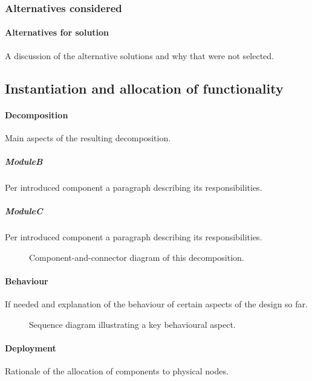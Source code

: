 \subsubsection*{Alternatives considered}
\paragraph{Alternatives for solution}
A discussion of the alternative solutions and why that were not selected.

\subsection{Instantiation and allocation of functionality}
\paragraph{Decomposition}
Main aspects of the resulting decomposition.

\subparagraph{ModuleB}
Per introduced component a paragraph describing its responsibilities.

\subparagraph{ModuleC}
Per introduced component a paragraph describing its responsibilities.

\begin{figure}[!htp]
	\centering
	\caption{Component-and-connector diagram of this decomposition.
	}\label{fig:it1-cc_main}
\end{figure}

\paragraph{Behaviour}
If needed and explanation of the behaviour of certain aspects of the design so
far.

\begin{figure}[!htp]
	\centering
	\caption{Sequence diagram illustrating a key behavioural aspect.
	}\label{fig:it1-seq_aspect1}
\end{figure}

\paragraph{Deployment}
Rationale of the allocation of components to physical nodes.

